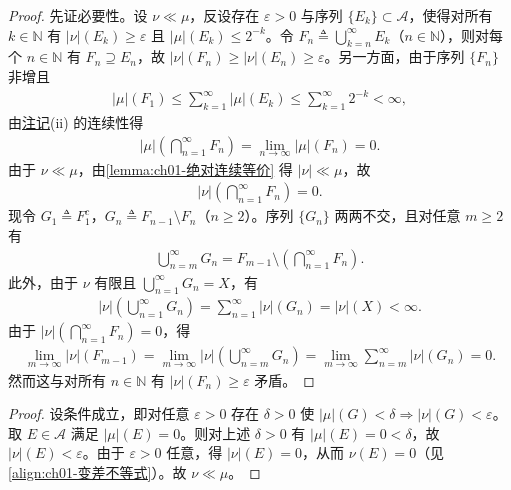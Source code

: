 \documentclass[../../main.tex]{subfiles}%
\begin{document}
\begin{proof}
先证必要性。设 $\nu\ll\mu$，反设存在 $\varepsilon>0$ 与序列 $\{E_k\}\subset\mathcal{A}$，使得对所有 $k\in\mathbb{N}$ 有 $|\nu|(E_k)\geqslant\varepsilon$ 且 $|\mu|(E_k)\leqslant2^{-k}$。令 $F_n\triangleq\bigcup_{k=n}^\infty E_k$（$n\in\mathbb{N}$），则对每个 $n\in\mathbb{N}$ 有 $F_n\supseteq E_n$，故 $|\nu|(F_n)\geqslant|\nu|(E_n)\geqslant\varepsilon$。另一方面，由于序列 $\{F_n\}$ 非增且
\begin{align*}
|\mu|(F_1)\leqslant\sum_{k=1}^\infty|\mu|(E_k)\leqslant\sum_{k=1}^\infty2^{-k}<\infty,
\end{align*}
由\hyperref[remark:ch01-带号测度性质]{注记}(ii) 的连续性得
\begin{align*}
|\mu|\left(\bigcap_{n=1}^\infty F_n\right)=\lim_{n\to\infty}|\mu|(F_n)=0.
\end{align*}
由于 $\nu\ll\mu$，由\cref{lemma:ch01-绝对连续等价} 得 $|\nu|\ll\mu$，故
\begin{align*}
|\nu|\left(\bigcap_{n=1}^\infty F_n\right)=0.
\end{align*}
现令 $G_1\triangleq F_1^c$，$G_n\triangleq F_{n-1}\setminus F_n$（$n\geqslant2$）。序列 $\{G_n\}$ 两两不交，且对任意 $m\geqslant2$ 有
\begin{align*}
\bigcup_{n=m}^\infty G_n=F_{m-1}\setminus\left(\bigcap_{n=1}^\infty F_n\right).
\end{align*}
此外，由于 $\nu$ 有限且 $\bigcup_{n=1}^\infty G_n=X$，有
\begin{align*}
|\nu|\left(\bigcup_{n=1}^\infty G_n\right)=\sum_{n=1}^\infty|\nu|(G_n)=|\nu|(X)<\infty.
\end{align*}
由于 $|\nu|\left(\bigcap_{n=1}^\infty F_n\right)=0$，得
\begin{align*}
\lim_{m\to\infty}|\nu|(F_{m-1})
=\lim_{m\to\infty}|\nu|\left(\bigcup_{n=m}^\infty G_n\right)
=\lim_{m\to\infty}\sum_{n=m}^\infty|\nu|(G_n)=0.
\end{align*}
然而这与对所有 $n\in\mathbb{N}$ 有 $|\nu|(F_n)\geqslant\varepsilon$ 矛盾。
\end{proof}

\begin{proof}
设条件成立，即对任意 $\varepsilon>0$ 存在 $\delta>0$ 使 $|\mu|(G)<\delta\Rightarrow|\nu|(G)<\varepsilon$。取 $E\in\mathcal{A}$ 满足 $|\mu|(E)=0$。则对上述 $\delta>0$ 有 $|\mu|(E)=0<\delta$，故 $|\nu|(E)<\varepsilon$。由于 $\varepsilon>0$ 任意，得 $|\nu|(E)=0$，从而 $\nu(E)=0$（见\eqref{align:ch01-变差不等式}）。故 $\nu\ll\mu$。
\end{proof}
\end{document}
